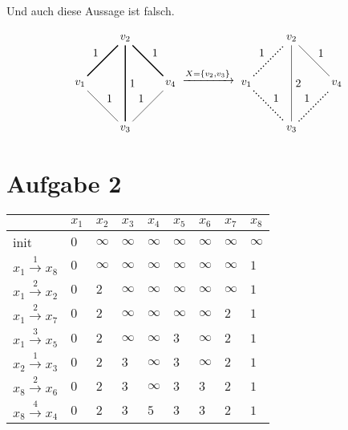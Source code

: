 \documentclass[a4paper]{article}
\begin{document}
\subsection{}
Und auch diese Aussage ist falsch.

\[
\begin{tikzpicture}[auto, node distance=2cm, baseline=0ex]
	\node (v1) {$v_1$};
	\node (v2) [above right of=v1] {$v_2$};
	\node (v3) [below right of=v1] {$v_3$};
	\node (v4) [below right of=v2] {$v_4$};
	\path
		(v1) edge [line width=1pt] node {1} (v2)
		(v1) edge node {1} (v3)
		(v2) edge [line width=1pt] node {1} (v3)
		(v2) edge [line width=1pt] node {1} (v4)
		(v3) edge node {1} (v4)
	;
\end{tikzpicture}
\xrightarrow{X = \{v_2, v_3\}}
\begin{tikzpicture}[auto, node distance=2cm, baseline=0ex]
	\node (v1) {$v_1$};
	\node (v2) [above right of=v1] {$v_2$};
	\node (v3) [below right of=v1] {$v_3$};
	\node (v4) [below right of=v2] {$v_4$};
	\path
		(v1) edge [line width=1pt, dotted] node {1} (v2)
		(v1) edge [line width=1pt, dotted] node {1} (v3)
		(v2) edge node {2} (v3)
		(v2) edge node {1} (v4)
		(v3) edge [line width=1pt, dotted] node {1} (v4)
	;
\end{tikzpicture}
\]

\section{Aufgabe 2}

\begin{tabular}{l|l|l|l|l|l|l|l|l}
	& $x_1$ & $x_2$ & $x_3$ & $x_4$ & $x_5$ & $x_6$ & $x_7$ & $x_8$ \\
\hline
init	& $0$ & $\infty$ & $\infty$ & $\infty$ & $\infty$ & $\infty$ & $\infty$ & $\infty$ \\
\hline
$x_1 \xrightarrow{1} x_8$	& $0$ & $\infty$ & $\infty$ & $\infty$ & $\infty$ & $\infty$ & $\infty$ & $1$ \\
\hline
$x_1 \xrightarrow{2} x_2$	& $0$ & $2$ & $\infty$ & $\infty$ & $\infty$ & $\infty$ & $\infty$ & $1$ \\
\hline
$x_1 \xrightarrow{2} x_7$	& $0$ & $2$ & $\infty$ & $\infty$ & $\infty$ & $\infty$ & $2$ & $1$ \\
\hline
$x_1 \xrightarrow{3} x_5$	& $0$ & $2$ & $\infty$ & $\infty$ & $3$ & $\infty$ & $2$ & $1$ \\
\hline
$x_2 \xrightarrow{1} x_3$	& $0$ & $2$ & $3$ & $\infty$ & $3$ & $\infty$ & $2$ & $1$ \\
\hline
$x_8 \xrightarrow{2} x_6$	& $0$ & $2$ & $3$ & $\infty$ & $3$ & $3$ & $2$ & $1$ \\
\hline
$x_8 \xrightarrow{4} x_4$	& $0$ & $2$ & $3$ & $5$ & $3$ & $3$ & $2$ & $1$ \\
\hline
\end{tabular}
\end{document}
